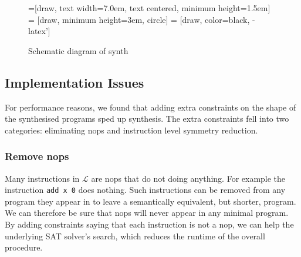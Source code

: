 \documentclass[a4paper]{llncs}
\begin{document}
\begin{figure}
\begin{center}
=[draw, text width=7.0em, text centered,
  minimum height=1.5em]
 = [draw, minimum height=3em, circle]
 = [draw, color=black, -latex']


\end{center}

\caption{Schematic diagram of {\sc synth}}
\label{fig:synth-dfd}
\end{figure}

\subsection{Implementation Issues}
For performance reasons, we found that adding extra constraints on the
shape of the synthesised programs sped up synthesis.  The extra constraints
fell into two categories: eliminating nops and instruction level symmetry reduction.

\subsubsection{Remove nops}
Many instructions in $\mathcal{L}$ are nops that do not doing anything.
For example the instruction \verb|add x 0| does nothing.  Such instructions
can be removed from any program they appear in to leave a semantically
equivalent, but shorter, program.  We can therefore be sure that nops
will never appear in any minimal program.  By adding constraints saying that
each instruction is not a nop, we can help the underlying SAT solver's
search, which reduces the runtime of the overall procedure.
\end{document}
